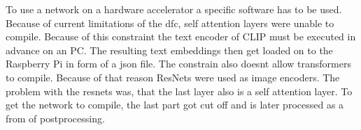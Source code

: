 To use a network on a hardware accelerator a specific software has to be used.
Because of current limitations of the \acrshort{dfc}, self attention layers were unable to compile.
Because of this constraint the text encoder of CLIP must be executed in advance on an PC.
The resulting text embeddings then get loaded on to the Raspberry Pi in form of a json file.
The constrain also doesnt allow transformers to compile.
Because of that reason ResNets were used as image encoders.
The problem with the resnets was, that the last layer also is a self attention layer.
To get the network to compile, the last part got cut off and is later processed as a from of postprocessing.

